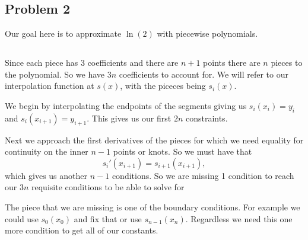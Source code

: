 \documentclass[12pt]{amsart}
\begin{document}
\begin{onehalfspace}
        \section{Problem 2}
        Our goal here is to approximate $\ln(2)$ with piecewise polynomials.

        \subsection{}
        Since each piece has 3 coefficients and there are $n+1$ points there are $n$ pieces to the polynomial.
        So we have $3n$ coefficients to account for.
        We will refer to our interpolation function at $s(x)$, with the piceces being $s_i(x)$.

        We begin by interpolating the endpoints of the segments giving us $s_i(x_i)=y_i$ and $s_i(x_{i+1}) = y_{i+1}$.
        This gives us our first $2n$ constraints.

        Next we approach the first derivatives of the pieces for which we need equality for continuity on the
        inner $n-1$ points or knots.
        So we must have that
        \[
            s_i'(x_{i+1}) = s_{i+1}(x_{i+1}),
        \]
        which gives us another $n-1$ conditions.
        So we are missing 1 condition to reach our $3n$ requisite conditions to be able to solve for

        The piece that we are missing is one of the boundary conditions. For example we could use
        $s_0(x_0)$ and fix that or use $s_{n-1}(x_n)$.
        Regardless we need this one more condition to get all of our constants.


\end{onehalfspace}
\end{document}
